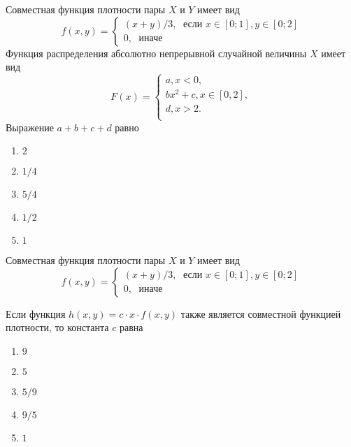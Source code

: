 \documentclass[t]{beamer}
\begin{document}
 \begin{frame} \label{20} 
\begin{block}{20} 

Совместная функция плотности пары $X$ и $Y$ имеет вид
\[
f(x,y)=\begin{cases}
(x+y)/3, \; \text{ если } x\in[0;1], y\in [0;2] \\
0, \; \text{ иначе}
\end{cases}
\]
Функция распределения абсолютно непрерывной случайной величины $X$ имеет вид
\[
F(x)=\begin{cases}
a, x<0,\\
b x^2+c, x \in [0,2],\\
d, x > 2.\\
\end{cases}
\]
Выражение $a+b+c+d$ равно
 


 \end{block} 
\begin{enumerate} 
\item[] \hyperlink{20-No}{\beamergotobutton{} $2$
}
\item[] \hyperlink{20-No}{\beamergotobutton{} $1/4$}
\item[] \hyperlink{20-Yes}{\beamergotobutton{} $5/4$}
\item[] \hyperlink{20-No}{\beamergotobutton{} $1/2$}
\item[] \hyperlink{20-No}{\beamergotobutton{} $1$}
\end{enumerate} 
\end{frame} 


 \begin{frame} \label{21} 
\begin{block}{21} 

Совместная функция плотности пары $X$ и $Y$ имеет вид
\[
f(x,y)=\begin{cases}
(x+y)/3, \; \text{ если } x\in[0;1], y\in [0;2] \\
0, \; \text{ иначе}
\end{cases}
\]

\vspace{0.5cm} 
 
Если функция $h(x,y)=c\cdot x\cdot f(x,y)$ также является совместной функцией плотности, то константа $c$ равна
 


 \end{block} 
\begin{enumerate} 
\item[] \hyperlink{21-No}{\beamergotobutton{} $9$}
\item[] \hyperlink{21-No}{\beamergotobutton{} $5$}
\item[] \hyperlink{21-No}{\beamergotobutton{} $5/9$}
\item[] \hyperlink{21-Yes}{\beamergotobutton{} $9/5$}
\item[] \hyperlink{21-No}{\beamergotobutton{} $1$}
\end{enumerate} 
\end{frame} 
\end{document}
